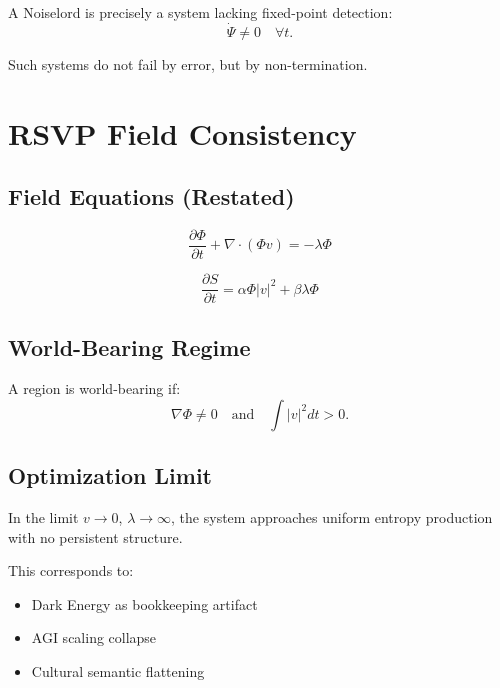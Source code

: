 \documentclass[11pt]{book}
\begin{document}
A Noiselord is precisely a system lacking fixed-point detection:
\[
\dot{\Psi} \neq 0 \quad \forall t.
\]

Such systems do not fail by error, but by non-termination.


\chapter{RSVP Field Consistency}

\section{Field Equations (Restated)}

\[
\frac{\partial \Phi}{\partial t} + \nabla \cdot (\Phi v) = -\lambda \Phi
\]

\[
\frac{\partial S}{\partial t} = \alpha \Phi |v|^2 + \beta \lambda \Phi
\]

\section{World-Bearing Regime}

\begin{definition}
A region is world-bearing if:
\[
\nabla \Phi \neq 0 \quad \text{and} \quad \int |v|^2 dt > 0.
\]
\end{definition}

\section{Optimization Limit}

\begin{proposition}
In the limit $v \to 0$, $\lambda \to \infty$, the system approaches
uniform entropy production with no persistent structure.
\end{proposition}

This corresponds to:
\begin{itemize}
\item Dark Energy as bookkeeping artifact
\item AGI scaling collapse
\item Cultural semantic flattening
\end{itemize}

\end{document}
